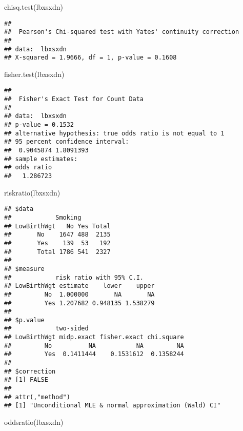\documentclass[
]{article}
\newenvironment{Shaded}{\begin{snugshade}}{\end{snugshade}}
\newcommand{\FunctionTok}[1]{\textcolor[rgb]{0.00,0.00,0.00}{#1}}
\newcommand{\NormalTok}[1]{#1}
\begin{document}
\begin{Shaded}
\begin{Highlighting}[]
\FunctionTok{chisq.test}\NormalTok{(lbxsxdn)}
\end{Highlighting}
\end{Shaded}

\begin{verbatim}
## 
##  Pearson's Chi-squared test with Yates' continuity correction
## 
## data:  lbxsxdn
## X-squared = 1.9666, df = 1, p-value = 0.1608
\end{verbatim}

\begin{Shaded}
\begin{Highlighting}[]
\FunctionTok{fisher.test}\NormalTok{(lbxsxdn)}
\end{Highlighting}
\end{Shaded}

\begin{verbatim}
## 
##  Fisher's Exact Test for Count Data
## 
## data:  lbxsxdn
## p-value = 0.1532
## alternative hypothesis: true odds ratio is not equal to 1
## 95 percent confidence interval:
##  0.9045874 1.8091393
## sample estimates:
## odds ratio 
##   1.286723
\end{verbatim}

\begin{Shaded}
\begin{Highlighting}[]
\FunctionTok{riskratio}\NormalTok{(lbxsxdn)}
\end{Highlighting}
\end{Shaded}

\begin{verbatim}
## $data
##            Smoking
## LowBirthWgt   No Yes Total
##       No    1647 488  2135
##       Yes    139  53   192
##       Total 1786 541  2327
## 
## $measure
##            risk ratio with 95% C.I.
## LowBirthWgt estimate    lower    upper
##         No  1.000000       NA       NA
##         Yes 1.207682 0.948135 1.538279
## 
## $p.value
##            two-sided
## LowBirthWgt midp.exact fisher.exact chi.square
##         No          NA           NA         NA
##         Yes  0.1411444    0.1531612  0.1358244
## 
## $correction
## [1] FALSE
## 
## attr(,"method")
## [1] "Unconditional MLE & normal approximation (Wald) CI"
\end{verbatim}

\begin{Shaded}
\begin{Highlighting}[]
\FunctionTok{oddsratio}\NormalTok{(lbxsxdn)}
\end{Highlighting}
\end{Shaded}
\end{document}
